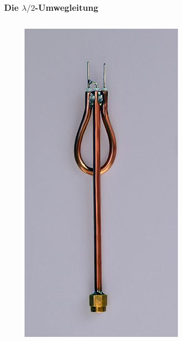 \begin{frame}
  \frametitle{Die $\lambda /2$-Umwegleitung}
  \begin{columns}
    \begin{figure}
      \includegraphics[height=.7\textheight,width=\textwidth,keepaspectratio]{a10/Umwegleitung.jpg}

\end{figure}
\end{columns}
\end{frame}
